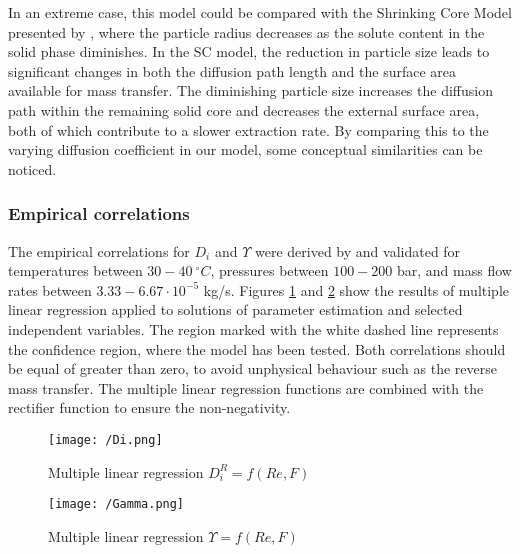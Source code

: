 \documentclass[../Article_Model_Parameters.tex]{subfiles}
\begin{document}
	In an extreme case, this model could be compared with the Shrinking Core Model presented by \citet{Goto1996}, where the particle radius decreases as the solute content in the solid phase diminishes. In the SC model, the reduction in particle size leads to significant changes in both the diffusion path length and the surface area available for mass transfer. The diminishing particle size increases the diffusion path within the remaining solid core and decreases the external surface area, both of which contribute to a slower extraction rate. By comparing this to the varying diffusion coefficient in our model, some conceptual similarities can be noticed.
	
	\subsubsection{Empirical correlations}
	
	The empirical correlations for $D_i$ and $\Upsilon$ were derived by \citet{Sliczniuk2024} and validated for temperatures between $30 - 40~^\circ C$, pressures between $100 - 200$ bar, and mass flow rates between $3.33-6.67 \cdot 10^{-5}$ kg/s. Figures \ref{fig:Correlation_Di} and \ref{fig:Correlation_Gamma} show the results of multiple linear regression applied to solutions of parameter estimation and selected independent variables. The region marked with the white dashed line represents the confidence region, where the model has been tested. Both correlations should be equal of greater than zero, to avoid unphysical behaviour such as the reverse mass transfer. The multiple linear regression functions are combined with the rectifier function to ensure the non-negativity.
	
	\begin{figure}[!ht]
		\centering
		\texttt{[image: /Di.png]}
		\caption{Multiple linear regression $D_i^R = f(Re, F)$}
		\label{fig:Correlation_Di}
	\end{figure}
	
	\begin{figure}[!ht]
		\centering
		\texttt{[image: /Gamma.png]}
		\caption{Multiple linear regression $\Upsilon = f(Re, F)$}
		\label{fig:Correlation_Gamma}
	\end{figure}
	
\end{document}
